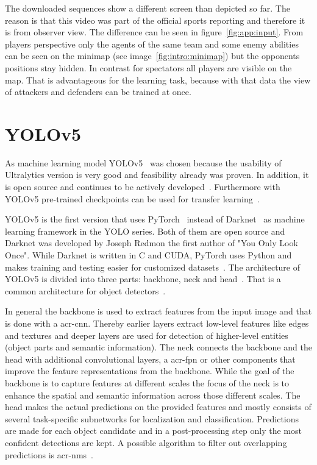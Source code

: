 The downloaded sequences show a different screen than depicted so far. The reason is that 
this video was part of the official sports reporting and therefore it is from observer view. The 
difference can be seen in figure~\ref{fig:app:input}. From players perspective only the agents of the 
same team and some enemy abilities can be seen on the minimap (see 
image~\ref{fig:intro:minimap}) but the opponents positions stay hidden. In contrast for spectators all 
players are visible on the map. That is advantageous for the learning task, because with that data the 
view of attackers and defenders can be trained at once. 

\section{YOLOv5}\label{sec:app:yolov5}

As machine learning model YOLOv5~\cite{jocher2020} was chosen because the usability of 
Ultralytics version is very good and feasibility already was proven. In addition, it is open source and 
continues to be actively developed~\cite{terven2023, river2021}. Furthermore with YOLOv5 
pre-trained checkpoints can be used for transfer learning~\cite{jocher2020}.

YOLOv5 is the first version that uses PyTorch~\cite{pytorch} instead of Darknet~\cite{darknet13} as 
machine learning framework in the YOLO series. Both of them are open source and Darknet was 
developed by Joseph Redmon the first author of "You Only Look Once". While Darknet is written in C 
and CUDA, PyTorch uses Python and makes training and testing easier for customized 
datasets~\cite{darknet13, pytorch, aydin2023, terven2023}. The architecture of YOLOv5 is divided 
into three parts: backbone, neck and head~\cite{archYolov5}. That is a common architecture for 
object detectors~\cite{terven2023}. 

In general the backbone is used to extract features from the input image and that is done with a 
\gls{acr-cnn}. Thereby earlier layers extract low-level features like edges and textures and deeper 
layers are used for detection of higher-level entities (object parts and semantic information). The 
neck connects the backbone and the head with additional convolutional layers, a \gls{acr-fpn} or 
other components that improve the feature representations from the backbone. While the goal of 
the backbone is to capture features at different scales the focus of the neck is to enhance the spatial 
and semantic information across those different scales. The head makes the actual predictions on 
the provided features and mostly consists of several task-specific subnetworks for localization and 
classification. Predictions are made for each object candidate and in a post-processing step only the 
most confident detections are kept. A possible algorithm to filter out overlapping predictions is 
\gls{acr-nms}~\cite{terven2023}.

